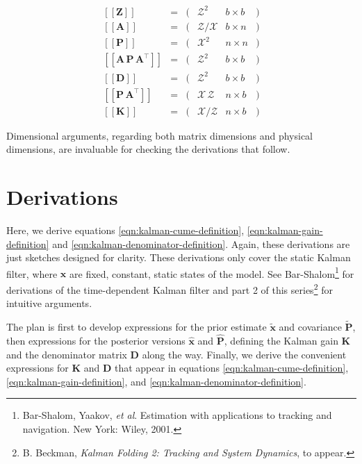 \documentclass[10pt,oneside,x11names]{article}
\begin{document}
\begin{equation}
\label{eqn:dimensional-breakdown}
\begin{array}{lccccr}
\left[\left[\mathbold{Z}\right]\right]                                       &=& (&\mathcal{Z}^2            & b\times{b}&) \\
\left[\left[\mathbold{A}\right]\right]                                       &=& (&\mathcal{Z}/\mathcal{X}  & b\times{n}&) \\
\left[\left[\mathbold{P}\right]\right]                                       &=& (&\mathcal{X}^2            & n\times{n}&) \\
\left[\left[\mathbold{A}\,\mathbold{P}\,\mathbold{A}^\intercal\right]\right] &=& (&\mathcal{Z}^2            & b\times{b}&) \\
\left[\left[\mathbold{D}\right]\right]                                       &=& (&\mathcal{Z}^2            & b\times{b}&) \\
\left[\left[\mathbold{P}\,\mathbold{A}^\intercal\right]\right]               &=& (&\mathcal{X}\,\mathcal{Z} & n\times{b}&) \\
\left[\left[\mathbold{K}\right]\right]                                       &=& (&\mathcal{X}/\mathcal{Z}  & n\times{b}&)
\end{array}
\end{equation}

Dimensional arguments, regarding both matrix dimensions and physical dimensions,
are invaluable for checking the derivations that follow.

\section{Derivations}
\label{sec:orgheadline14}

Here, we derive equations \ref{eqn:kalman-cume-definition},
\ref{eqn:kalman-gain-definition} and \ref{eqn:kalman-denominator-definition}.
Again, these derivations are just sketches designed for clarity. 
These derivations only cover the
static Kalman filter, where \(\mathbold{x}\) are
fixed, constant, static states of the model. See Bar-Shalom\footnote{Bar-Shalom, Yaakov, \emph{et al}. Estimation with applications to tracking and navigation. New York: Wiley, 2001.} for
derivations of the time-dependent Kalman filter and part 2 of this series\footnote{B. Beckman, \emph{Kalman Folding 2: Tracking and System Dynamics}, to appear.} for
intuitive arguments.

The plan is first to develop expressions for the prior estimate
\(\tilde{\mathbold{x}}\) and covariance \(\tilde{\mathbold{P}}\), then expressions
for the posterior versions \(\hat{\mathbold{x}}\) and \(\hat{\mathbold{P}}\),
defining the Kalman gain \(\mathbold{K}\) and the denominator matrix
\(\mathbold{D}\) along the way. Finally, we derive the convenient expressions for \(\mathbold{K}\)
and \(\mathbold{D}\) that appear in equations \ref{eqn:kalman-cume-definition},
\ref{eqn:kalman-gain-definition}, and \ref{eqn:kalman-denominator-definition}. 
\end{document}
